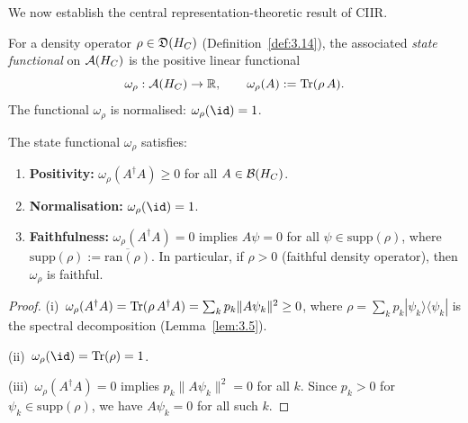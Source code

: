 We now establish the central representation-theoretic result of CIIR.

\begin{definition}
\label{def:5.9}
For a density operator $\rho \in \mathfrak{D}(H_C)$
(Definition~\ref{def:3.14}), the associated \emph{state functional}
on $\mathcal{A}(H_C)$ is the positive linear functional
\[
  \omega_\rho : \mathcal{A}(H_C) \to \mathbb{R},
  \qquad
  \omega_\rho(A) := \mathrm{Tr}(\rho\, A).
\]
The functional $\omega_\rho$ is normalised: $\omega_\rho(\id) = 1$.
\end{definition}

\begin{lemma}
\label{lem:5.6}
The state functional $\omega_\rho$ satisfies:
\begin{enumerate}
  \item[\textup{(i)}] \textbf{Positivity:}
    $\omega_\rho(A^\dagger A) \geq 0$ for all $A \in \mathcal{B}(H_C)$.
  \item[\textup{(ii)}] \textbf{Normalisation:}
    $\omega_\rho(\id) = 1$.
  \item[\textup{(iii)}] \textbf{Faithfulness:}
    $\omega_\rho(A^\dagger A) = 0$ implies $A\psi = 0$ for all
    $\psi \in \mathrm{supp}(\rho)$, where
    $\mathrm{supp}(\rho) := \overline{\mathrm{ran}(\rho)}$.
    In particular, if $\rho > 0$ \textup{(}faithful density
    operator\textup{)}, then $\omega_\rho$ is faithful.
\end{enumerate}
\end{lemma}

\begin{proof}
(i)~$\omega_\rho(A^\dagger A) = \mathrm{Tr}(\rho\, A^\dagger A)
= \sum_k p_k \|A\psi_k\|^2 \geq 0$, where
$\rho = \sum_k p_k |\psi_k\rangle\langle\psi_k|$ is the spectral
decomposition (Lemma~\ref{lem:3.5}).

(ii)~$\omega_\rho(\id) = \Tr(\rho) = 1$.

(iii)~$\omega_\rho(A^\dagger A) = 0$ implies $p_k\|A\psi_k\|^2 = 0$
for all $k$.  Since $p_k > 0$ for $\psi_k \in \mathrm{supp}(\rho)$,
we have $A\psi_k = 0$ for all such $k$.
\end{proof}


